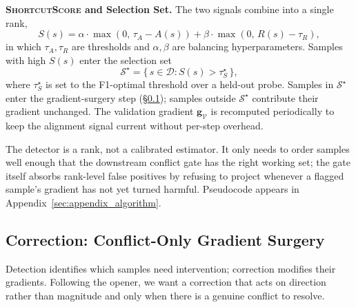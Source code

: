 \textbf{\textsc{ShortcutScore} and Selection Set.} The two signals combine into a single rank,
\begin{equation}
    S(s) = \alpha \cdot \max(0,\, \tau_A - A(s)) + \beta \cdot \max(0,\, R(s) - \tau_R),
\end{equation}
in which $\tau_A,\tau_R$ are thresholds and $\alpha,\beta$ are balancing hyperparameters. Samples with high $S(s)$ enter the selection set
\begin{equation}
    \mathcal{S}^\star = \{\, s \in \mathcal{D} : S(s) > \tau_S^\star \,\},
\end{equation}
where $\tau_S^\star$ is set to the F1-optimal threshold over a held-out probe. Samples in $\mathcal{S}^\star$ enter the gradient-surgery step (\S\ref{sec:gradient_surgery}); samples outside $\mathcal{S}^\star$ contribute their gradient unchanged. The validation gradient $\mathbf{g}_{\mathcal{V}}$ is recomputed periodically to keep the alignment signal current without per-step overhead.

The detector is a rank, not a calibrated estimator. It only needs to order samples well enough that the downstream conflict gate has the right working set; the gate itself absorbs rank-level false positives by refusing to project whenever a flagged sample's gradient has not yet turned harmful. Pseudocode appears in Appendix~\ref{sec:appendix_algorithm}.

\subsection{Correction: Conflict-Only Gradient Surgery}
\label{sec:gradient_surgery}

Detection identifies which samples need intervention; correction modifies their gradients. Following the opener, we want a correction that acts on direction rather than magnitude and only when there is a genuine conflict to resolve.

